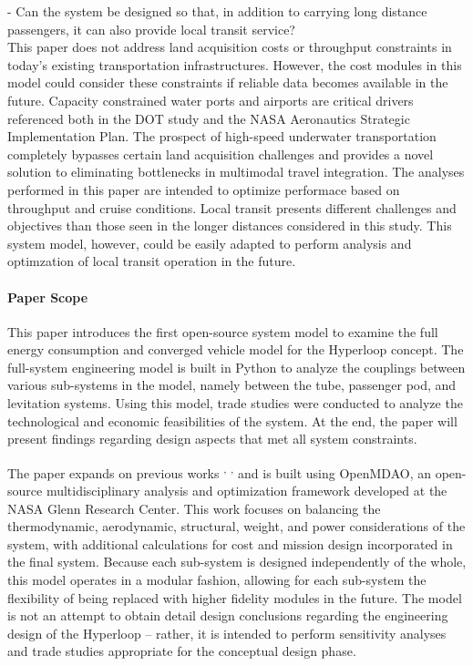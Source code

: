 	- Can the system be designed so that, in addition to carrying long distance
	passengers, it can also provide local transit service?\\

	This paper does not address land acquisition costs or throughput
	constraints in today's existing transportation infrastructures. However, the cost 
	modules in this model could consider these constraints if reliable data becomes available in the future.
	Capacity constrained water ports and airports are critical drivers referenced
	both in the DOT study and the NASA Aeronautics Strategic
	Implementation Plan. The prospect of high-speed underwater transportation
	completely bypasses certain land acquisition challenges and provides a novel solution
	to eliminating bottlenecks in multimodal travel integration. The analyses performed in this paper 
	are intended to optimize performace based on throughput and cruise conditions. 
	Local transit presents different challenges and objectives than those seen in the longer distances 
	considered in this study. This system model, however, could be easily adapted to perform 
	analysis and optimzation of local transit operation in the future.\\

\paragraph{Paper Scope}
	This paper introduces the first open-source system model to examine the
	full energy consumption and converged vehicle model for the Hyperloop concept.
	The full-system engineering model is built in Python to analyze the couplings
	between various sub-systems in the model, namely between the tube, passenger pod, and
	levitation systems. Using this model, trade studies were conducted to analyze the technological
	and economic feasibilities of the system.
	At the end, the paper will present findings regarding design aspects that
	met all system constraints.

	The paper expands on previous works \cite{Chin} \textsuperscript{,}
	\cite{goodwin2009cantera}\textsuperscript{,} \cite{GrayBenchmarking2013}
	and is built using OpenMDAO, an open-source multidisciplinary analysis and optimization framework 
	developed at the NASA Glenn Research Center.
	This work focuses on balancing the thermodynamic, aerodynamic, structural,
	weight, and power considerations of the system, with additional calculations for cost
	and mission design incorporated in the final system. Because each sub-system
	is designed independently of the whole, this model operates in a modular fashion, allowing
	for each sub-system the flexibility of being replaced with higher fidelity modules in the future.
	The model is not an attempt to obtain detail design conclusions regarding the
	engineering design of the Hyperloop -- rather, it is intended to perform sensitivity analyses and 
	trade studies appropriate for the conceptual design phase.

